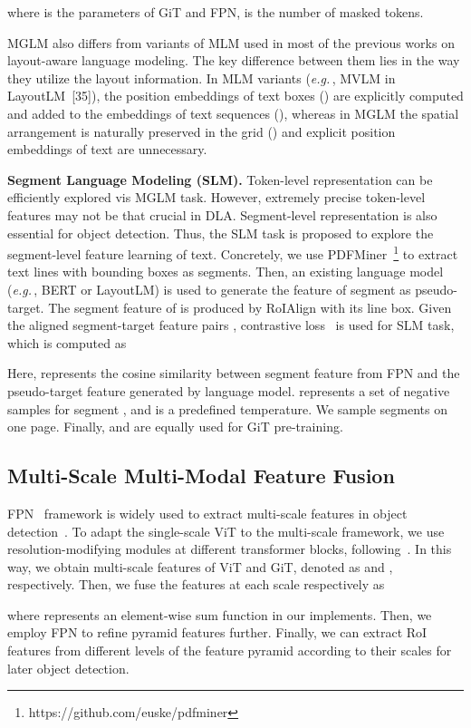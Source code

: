\documentclass[10pt,twocolumn,letterpaper]{article}
\def\eg{\emph{e.g.}\,}
\begin{document}
where  is the parameters of GiT and FPN,  is the number of masked tokens.

MGLM also differs from variants of MLM used in most of the previous works on layout-aware language modeling.
The key difference between them lies in the way they utilize the  layout information. In MLM variants (\eg, MVLM in LayoutLM~[35]), the  position embeddings of text boxes () are explicitly computed and added to the embeddings of text sequences (), whereas in MGLM the  spatial arrangement is naturally preserved in the  grid  () and explicit  position embeddings of text are unnecessary.


\noindent
\textbf{Segment Language Modeling (SLM).}
Token-level representation can be efficiently explored vis MGLM task.
However, extremely precise token-level features may not be that crucial in DLA.
Segment-level representation is also essential for object detection.
Thus, the SLM task is proposed to explore the segment-level feature learning of text.
Concretely, we use PDFMiner~\footnote{https://github.com/euske/pdfminer} to extract text lines with bounding boxes as segments.
Then, an existing language model (\eg, BERT or LayoutLM) is used to generate the feature  of segment  as pseudo-target.
The segment feature  of  is produced by RoIAlign with its line box.
Given the aligned segment-target feature pairs , contrastive loss~\cite{regionclip} is used for SLM task, which is computed as

Here,  represents the cosine similarity between segment feature  from FPN and the pseudo-target feature  generated by language model.
 represents a set of negative samples for segment ,
and  is a predefined temperature. 
We sample  segments on one page.
Finally,  and  are equally used for GiT pre-training.

\subsection{Multi-Scale Multi-Modal Feature Fusion}
FPN~\cite{FPN} framework is widely used to extract multi-scale features in object detection~\cite{maskrcnn}.
To adapt the single-scale ViT to the multi-scale framework,
we use  resolution-modifying modules at different transformer blocks, following~\cite{li2022dit}.
In this way, we obtain multi-scale features of ViT and GiT, denoted as 
 and , respectively.
Then, we fuse the features at each scale  respectively as

where  represents an element-wise sum function in our implements.
Then, we employ FPN to refine pyramid features   further.
Finally, we can extract RoI features from different levels of the feature pyramid according to their scales for later object detection.
\end{document}
